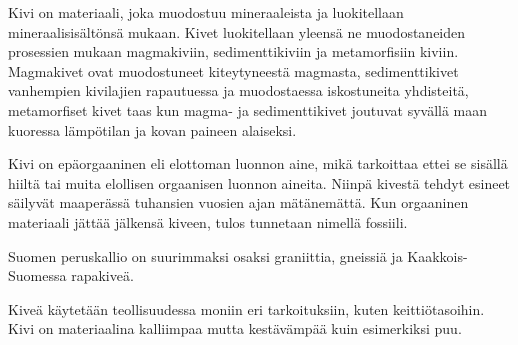 Kivi on materiaali, joka muodostuu mineraaleista ja luokitellaan
mineraalisis{\"a}lt{\"o}ns{\"a} mukaan. Kivet luokitellaan yleens{\"a} ne muodostaneiden
prosessien mukaan magmakiviin, sedimenttikiviin ja metamorfisiin kiviin.
Magmakivet ovat muodostuneet kiteytyneest{\"a} magmasta, sedimenttikivet vanhempien
kivilajien rapautuessa ja muodostaessa iskostuneita yhdisteit{\"a}, metamorfiset
kivet taas kun magma- ja sedimenttikivet joutuvat syv{\"a}ll{\"a} maan kuoressa
l{\"a}mp{\"o}tilan ja kovan paineen alaiseksi.

Kivi on ep{\"a}orgaaninen eli elottoman luonnon aine, mik{\"a} tarkoittaa ettei se
sis{\"a}ll{\"a} hiilt{\"a} tai muita elollisen orgaanisen luonnon aineita. Niinp{\"a} kivest{\"a}
tehdyt esineet s{\"a}ilyv{\"a}t maaper{\"a}ss{\"a} tuhansien vuosien ajan m{\"a}t{\"a}nem{\"a}tt{\"a}. Kun
orgaaninen materiaali j{\"a}tt{\"a}{\"a} j{\"a}lkens{\"a} kiveen, tulos tunnetaan nimell{\"a} fossiili.

Suomen peruskallio on suurimmaksi osaksi graniittia, gneissi{\"a} ja
Kaakkois-Suomessa rapakive{\"a}.

Kive{\"a} k{\"a}ytet{\"a}{\"a}n teollisuudessa moniin eri tarkoituksiin, kuten keitti{\"o}tasoihin.
Kivi on materiaalina kalliimpaa mutta kest{\"a}v{\"a}mp{\"a}{\"a} kuin esimerkiksi puu.
